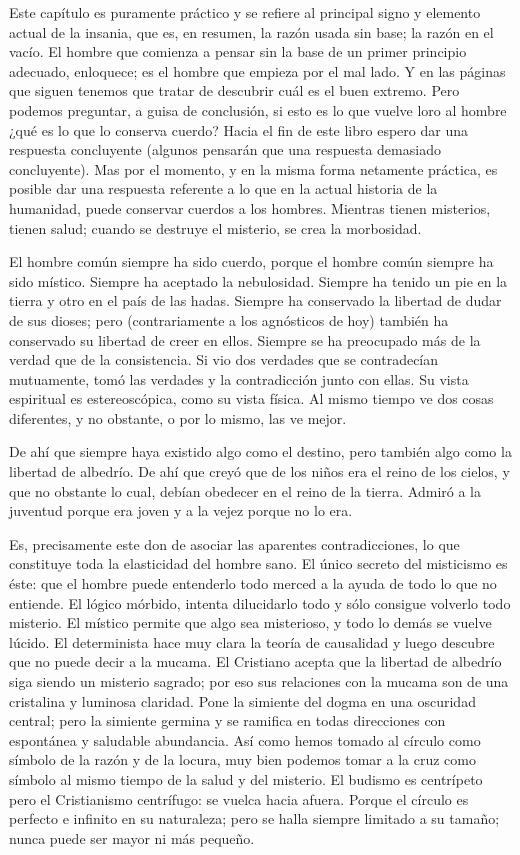 Este capítulo es puramente práctico y se refiere al principal signo y elemento actual de la insania,
que es, en resumen, la razón usada sin base; la razón en el vacío. El hombre que comienza a pensar sin la
base de un primer principio adecuado, enloquece; es el hombre que empieza por el mal lado. Y en las
páginas que siguen tenemos que tratar de descubrir cuál es el buen extremo. Pero podemos preguntar, a
guisa de conclusión, si esto es lo que vuelve loro al hombre ¿qué es lo que lo conserva cuerdo?
Hacia el fin de este libro espero dar una respuesta concluyente (algunos pensarán que una respuesta
demasiado concluyente). Mas por el momento, y en la misma forma netamente práctica, es posible dar
una respuesta referente a lo que en la actual historia de la humanidad, puede conservar cuerdos a los
hombres. Mientras tienen misterios, tienen salud; cuando se destruye el misterio, se crea la morbosidad.

El hombre común siempre ha sido cuerdo, porque el hombre común siempre ha sido místico. Siempre ha
aceptado la nebulosidad. Siempre ha tenido un pie en la tierra y otro en el país de las hadas. Siempre ha
conservado la libertad de dudar de sus dioses; pero (contrariamente a los agnósticos de hoy) también ha
conservado su libertad de creer en ellos. Siempre se ha preocupado más de la verdad que de la
consistencia. Si vio dos verdades que se contradecían mutuamente, tomó las verdades y la contradicción
junto con ellas. Su vista espiritual es estereoscópica, como su vista física. Al mismo tiempo ve dos cosas
diferentes, y no obstante, o por lo mismo, las ve mejor.

De ahí que siempre haya existido algo como el destino, pero también algo como la libertad de
albedrío. De ahí que creyó que de los niños era el reino de los cielos, y que no obstante lo cual, debían
obedecer en el reino de la tierra. Admiró a la juventud porque era joven y a la vejez porque no lo era.

Es, precisamente este don de asociar las aparentes contradicciones, lo que constituye toda la
elasticidad del hombre sano. El único secreto del misticismo es éste: que el hombre puede entenderlo todo
merced a la ayuda de todo lo que no entiende. El lógico mórbido, intenta dilucidarlo todo y sólo consigue
volverlo todo misterio. El místico permite que algo sea misterioso, y todo lo demás se vuelve lúcido. El
determinista hace muy clara la teoría de causalidad y luego descubre que no puede decir  a la
mucama. El Cristiano acepta que la libertad de albedrío siga siendo un misterio sagrado; por eso sus
relaciones con la mucama son de una cristalina y luminosa claridad. Pone la simiente del dogma en una
oscuridad central; pero la simiente germina y se ramifica en todas direcciones con espontánea y saludable
abundancia. Así como hemos tomado al círculo como símbolo de la razón y de la locura, muy bien
podemos tomar a la cruz como símbolo al mismo tiempo de la salud y del misterio. El budismo es
centrípeto pero el Cristianismo centrífugo: se vuelca hacia afuera. Porque el círculo es perfecto e infinito
en su naturaleza; pero se halla siempre limitado a su tamaño; nunca puede ser mayor ni más pequeño.

